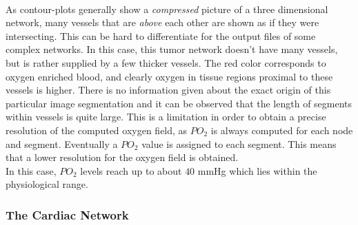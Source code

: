 \\As contour-plots generally show a \emph{compressed} picture of a three dimensional network, many vessels that are \emph{above} each other are shown as if they were intersecting. This can be hard to differentiate for the output files of some complex networks. In this case, this tumor network doesn't have many vessels, but is rather supplied by a few thicker vessels. The red color corresponds to oxygen enriched blood, and clearly oxygen in tissue regions proximal to these vessels is higher. There is no information given about the exact origin of this particular image segmentation and it can be observed that the length of segments within vessels is quite large. This is a limitation in order to obtain a precise resolution of the computed oxygen field, as $PO_2$ is always computed for each node and segment. Eventually a $PO_2$ value is assigned to each segment. This means that a lower resolution for the oxygen field is obtained.
\\In this case, $PO_2$ levels reach up to about $40$ mmHg which lies within the physiological range.



\newpage
\subsubsection*{The Cardiac Network}

